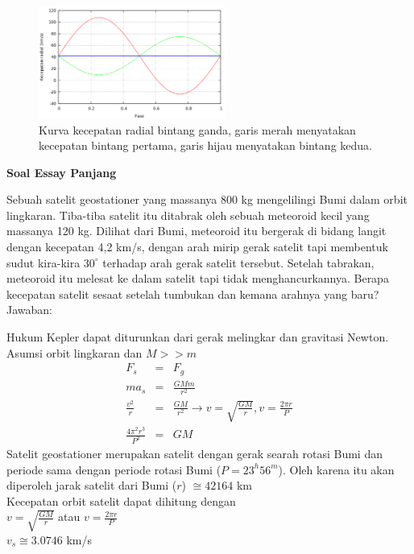 \documentclass[11pt,fleqn]{exam}
\begin{document}
\begin{questions}
\begin{figure}[H]
\centering
\includegraphics[width=0.55\textwidth]{kec-radial.png}
\caption{Kurva kecepatan radial bintang ganda, garis merah menyatakan kecepatan bintang pertama, garis hijau menyatakan bintang kedua.}
\end{figure}

\newpage
\textbf{Soal Essay Panjang}

\question Sebuah satelit geostationer yang massanya 800 kg mengelilingi Bumi dalam orbit lingkaran. Tiba-tiba satelit itu ditabrak oleh sebuah meteoroid kecil yang massanya 120 kg. Dilihat dari Bumi, meteoroid itu bergerak di bidang langit dengan kecepatan 4,2 km/s, dengan arah mirip gerak satelit tapi membentuk sudut kira-kira $30^{\circ}$ terhadap arah gerak satelit tersebut. Setelah tabrakan, meteoroid itu melesat ke dalam satelit tapi tidak menghancurkannya. Berapa kecepatan satelit sesaat setelah tumbukan dan kemana arahnya yang baru?\\


Jawaban: 

Hukum Kepler dapat diturunkan dari gerak melingkar dan gravitasi Newton. Asumsi orbit lingkaran dan $M >> m$
\begin{eqnarray*}
F_{s} &=& F_{g}\\
ma_s &=& \frac{GMm}{r^{2}}\\
\frac{v^2}{r} &=& \frac{GM}{r^{2}} \rightarrow v = \sqrt{\frac{GM}{r}}, v = \frac{2 \pi r}{P}\\
\frac{4 \pi^{2} r^{3}}{P^{2}} &=& GM 
\end{eqnarray*}
Satelit geostationer merupakan satelit dengan gerak searah rotasi Bumi dan periode sama dengan periode rotasi Bumi ($P = 23^{h}56^{m}$). Oleh karena itu akan diperoleh jarak satelit dari Bumi ($r$) $\cong 42164$ km\\

Kecepatan orbit satelit dapat dihitung dengan\\
$v = \sqrt{\frac{GM}{r}}$ atau $v = \frac{2 \pi r}{P}$\\
$v_s \cong 3.0746$ km/s


\end{questions}
\end{document}
